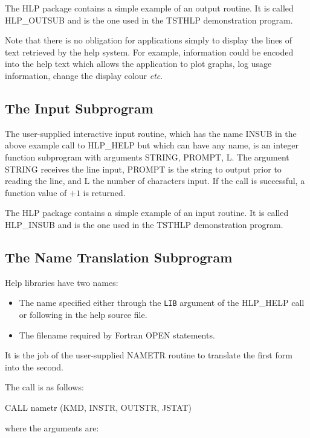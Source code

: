 \documentclass[11pt,nolof]{starlink}
\providecommand{\qt}[1]{``{\tt{#1}}''}
\providecommand{\fstring}[1]{\hbox{\hspace{0.05em}{\qt{#1}}\hspace{0.05em}}}
\begin{document}
The HLP package contains a simple example of an output routine.  It
is called HLP\_OUTSUB and is the one used in the TSTHLP demonstration
program.

Note that there is no obligation for applications simply to display
the lines of text retrieved by the help system.  For example,
information could be encoded into the help text which allows the
application to plot graphs, log usage information, change the
display colour \textit{etc}.

\subsection{The Input Subprogram}
The user-supplied interactive input routine, which has the name INSUB
in the above
example call to HLP\_HELP but which can have any name, is an
integer function subprogram with arguments STRING, PROMPT, L.
The argument STRING
receives the line input, PROMPT is the string to output prior to
reading the line, and L the number of characters input.  If the
call is successful, a function value of $+1$ is returned.

The HLP package contains a simple example of an input routine.  It
is called HLP\_INSUB and is the one used in the TSTHLP demonstration
program.

\subsection{The Name Translation Subprogram}
Help libraries have two names:
\begin{itemize}
\item The name specified either through the \texttt{LIB} argument of the
HLP\_HELP call or following \fstring{@} in the help source file.
\item The filename required by Fortran OPEN statements.
\end{itemize}
It is the job of the user-supplied
NAMETR routine to translate the first form into the second.

The call is as follows:
\begin{terminalv}
CALL nametr (KMD, INSTR, OUTSTR, JSTAT)
\end{terminalv}
where the arguments are:
\end{document}
